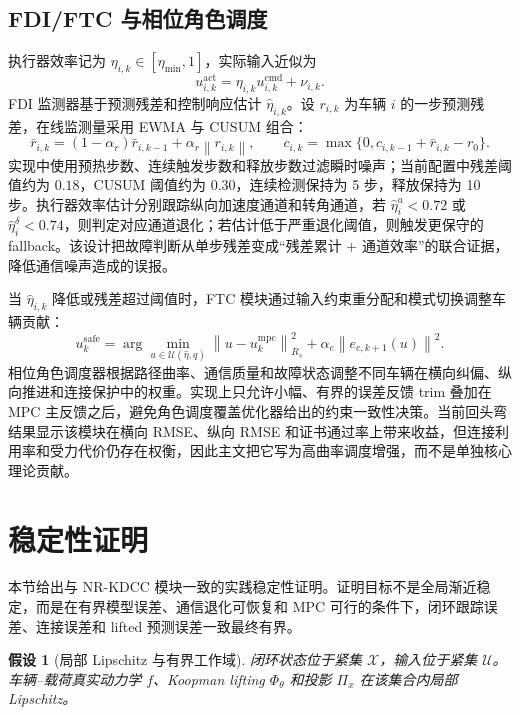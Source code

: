 \documentclass[twocolumn,3p,times,procedia]{elsarticle}
\newcommand{\Method}{NR-KDCC}
\newcommand{\norm}[1]{\left\lVert #1 \right\rVert}
\newtheorem{assumption}{假设}
\begin{document}
\subsection{FDI/FTC 与相位角色调度}

执行器效率记为 $\eta_{i,k}\in[\eta_{\min},1]$，实际输入近似为
\begin{equation}
u_{i,k}^{\mathrm{act}}=\eta_{i,k}u_{i,k}^{\mathrm{cmd}}+\nu_{i,k}.
\label{eq:actuator_efficiency}
\end{equation}
FDI 监测器基于预测残差和控制响应估计 $\hat\eta_{i,k}$。设 $r_{i,k}$ 为车辆 $i$ 的一步预测残差，在线监测量采用 EWMA 与 CUSUM 组合：
\begin{equation}
\bar r_{i,k}=(1-\alpha_r)\bar r_{i,k-1}+\alpha_r\norm{r_{i,k}},\qquad
c_{i,k}=\max\{0,c_{i,k-1}+\bar r_{i,k}-r_0\}.
\label{eq:fdi_ewma_cusum}
\end{equation}
实现中使用预热步数、连续触发步数和释放步数过滤瞬时噪声；当前配置中残差阈值约为 $0.18$，CUSUM 阈值约为 $0.30$，连续检测保持为 5 步，释放保持为 10 步。执行器效率估计分别跟踪纵向加速度通道和转角通道，若 $\hat\eta^a_i<0.72$ 或 $\hat\eta^\delta_i<0.74$，则判定对应通道退化；若估计低于严重退化阈值，则触发更保守的 fallback。该设计把故障判断从单步残差变成“残差累计 + 通道效率”的联合证据，降低通信噪声造成的误报。

当 $\hat\eta_{i,k}$ 降低或残差超过阈值时，FTC 模块通过输入约束重分配和模式切换调整车辆贡献：
\begin{equation}
u_k^\mathrm{safe}=\arg\min_{u\in\mathcal U(\hat\eta,q)}
\norm{u-u_k^\mathrm{mpc}}_{R_s}^2+
\alpha_e\norm{e_{c,k+1}(u)}^2 .
\label{eq:ftc_projection}
\end{equation}
相位角色调度器根据路径曲率、通信质量和故障状态调整不同车辆在横向纠偏、纵向推进和连接保护中的权重。实现上只允许小幅、有界的误差反馈 trim 叠加在 MPC 主反馈之后，避免角色调度覆盖优化器给出的约束一致性决策。当前回头弯结果显示该模块在横向 RMSE、纵向 RMSE 和证书通过率上带来收益，但连接利用率和受力代价仍存在权衡，因此主文把它写为高曲率调度增强，而不是单独核心理论贡献。

\section{稳定性证明}

本节给出与 \Method{} 模块一致的实践稳定性证明。证明目标不是全局渐近稳定，而是在有界模型误差、通信退化可恢复和 MPC 可行的条件下，闭环跟踪误差、连接误差和 lifted 预测误差一致最终有界。

\begin{assumption}[局部 Lipschitz 与有界工作域]
闭环状态位于紧集 $\mathcal X$，输入位于紧集 $\mathcal U$。车辆--载荷真实动力学 $f$、Koopman lifting $\Phi_\theta$ 和投影 $\Pi_x$ 在该集合内局部 Lipschitz。
\end{assumption}
\end{document}
